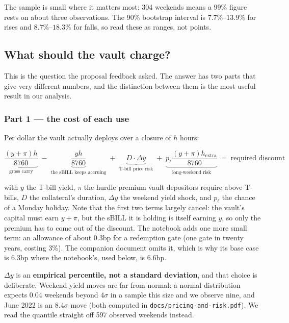 \documentclass[11pt,a4paper]{article}
\newcommand{\note}[1]{{\small\color{muted}#1}}
\begin{document}
\note{The sample is small where it matters most: 304 weekends means a 99\% figure rests on about
three observations. The 90\% bootstrap interval is $7.7\%$--$13.9\%$ for rises and
$8.7\%$--$18.3\%$ for falls, so read these as ranges, not points.}

\subsection{What should the vault charge?}\label{sec:vaulteconomics}

This is the question the proposal feedback asked. The answer has two parts that give very different
numbers, and the distinction between them is the most useful result in our analysis.

\subsubsection*{Part 1 --- the cost of each use}

Per dollar the vault actually deploys over a closure of $h$ hours:

\[
\underbrace{\frac{(y+\pi)h}{8760}}_{\text{gross carry}}
\;-\;\underbrace{\frac{yh}{8760}}_{\text{the sBILL keeps accruing}}
\;+\;\underbrace{D\cdot\Delta y}_{\text{T-bill price risk}}
\;+\;\underbrace{p_{\ell}\frac{(y+\pi)h_{\text{extra}}}{8760}}_{\text{long-weekend risk}}
\;=\;\text{required discount}
\]

with $y$ the T-bill yield, $\pi$ the hurdle premium vault depositors require above T-bills, $D$ the
collateral's duration, $\Delta y$ the weekend yield shock, and $p_\ell$ the chance of a Monday
holiday. Note that the first two terms largely cancel: the vault's capital must earn $y+\pi$, but the
sBILL it is holding is itself earning $y$, so only the premium has to come out of the discount. The
notebook adds one more small term: an allowance of about 0.3bp for a redemption gate (one gate in
twenty years, costing 3\%). The companion document omits it, which is why its base case is 6.3bp
where the notebook's, used below, is 6.6bp.

$\Delta y$ is an \textbf{empirical percentile, not a standard deviation}, and that choice is
deliberate. Weekend yield moves are far from normal: a normal distribution expects 0.04 weekends
beyond $4\sigma$ in a sample this size and we observe nine, and June 2022 is an $8.4\sigma$ move
(both computed in \texttt{docs/pricing-and-risk.pdf}). We read the quantile straight off 597
observed weekends instead.
\end{document}
